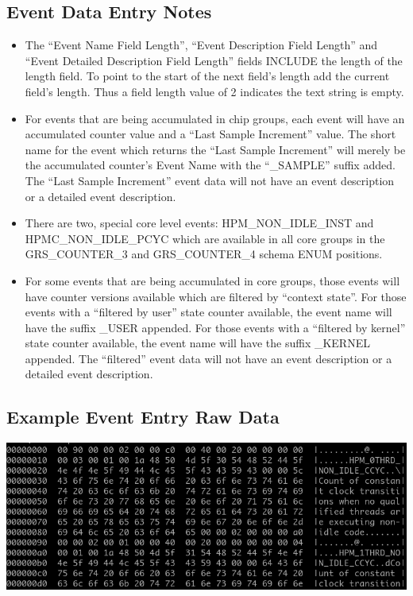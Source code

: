\documentclass[14]{article}
\begin{document}
\subsection{Event Data Entry Notes}
\begin{itemize}
\item The “Event Name Field Length”, “Event Description Field Length” and “Event
  Detailed Description Field Length” fields INCLUDE the length of the length
  field. To point to the start of the next field's length add the current
  field's length. Thus a field length value of 2 indicates the text string is
  empty.
\item For events that are being accumulated in chip groups, each event will have
  an accumulated counter value and a “Last Sample Increment” value. The short
  name for the event which returns the “Last Sample Increment” will merely be
  the accumulated counter's Event Name with the “\_SAMPLE” suffix added. The
  “Last Sample Increment” event data will not have an event description or a
  detailed event description.
\item There are two, special core level events: HPM\_NON\_IDLE\_INST and
  HPMC\_NON\_IDLE\_PCYC which are available in all core groups in the
  GRS\_COUNTER\_3 and GRS\_COUNTER\_4 schema ENUM positions.
\item For some events that are being accumulated in core groups, those events
  will have counter versions available which are filtered by “context
  state”. For those events with a “filtered by user” state counter available,
  the event name will have the suffix \_USER appended. For those events with a
  “filtered by kernel” state counter available, the event name will have the
  suffix \_KERNEL appended. The “filtered” event data will not have an event
  description or a detailed event description.
\end{itemize}

\subsection{Example Event Entry Raw Data}
\includegraphics[scale=0.6]{events_raw.png}
\end{document}
